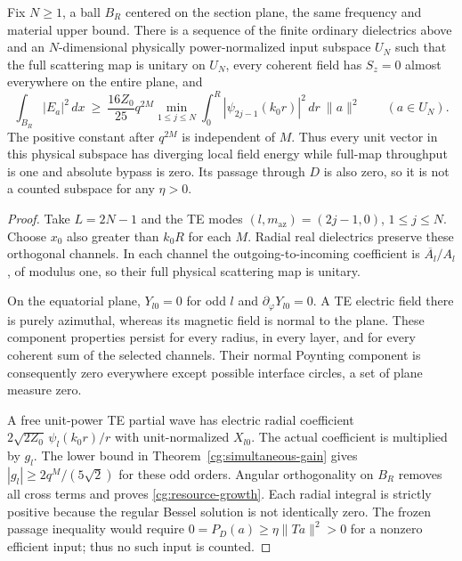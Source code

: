 \begin{theorem}
\label{cg:resource-counteraudit}
Fix $N\geq1$, a ball $B_R$ centered on the section plane, the same
frequency and material upper bound.  There is a sequence of the finite
ordinary dielectrics above and an $N$-dimensional physically
power-normalized input subspace $U_N$ such that the full scattering
map is unitary on $U_N$, every coherent field has
$S_z=0$ almost everywhere on the entire plane, and
\begin{equation}\label{cg:resource-growth}
 \int_{B_R}|E_a|^2\,dx
 \ \geq\ \frac{16Z_0}{25}q^{2M}
       \min_{1\leq j\leq N}
          \int_0^R|\psi_{2j-1}(k_0r)|^2\,dr\ \|a\|^2
 \qquad(a\in U_N).
\end{equation}
The positive constant after $q^{2M}$ is independent of $M$.
Thus every unit vector in this physical subspace has diverging local
field energy while full-map throughput is one and absolute bypass is
zero.  Its passage through $D$ is also zero, so it is not a counted
subspace for any $\eta>0$.
\end{theorem}
\begin{proof}
Take $L=2N-1$ and the TE modes $(l,m_{\mathrm{az}})=(2j-1,0)$,
$1\leq j\leq N$.  Choose $x_0$ also greater than $k_0R$ for each
$M$.  Radial real dielectrics preserve these orthogonal channels.
In each channel the outgoing-to-incoming coefficient is
$\overline{A_l}/A_l$, of modulus one, so their full physical
scattering map is unitary.

On the equatorial plane, $Y_{l0}=0$ for odd $l$ and
$\partial_\varphi Y_{l0}=0$.  A TE electric field there is purely
azimuthal, whereas its magnetic field is normal to the plane.
These component properties persist for every radius, in every layer,
and for every coherent sum of the selected channels.  Their normal
Poynting component is consequently zero everywhere except possible
interface circles, a set of plane measure zero.

A free unit-power TE partial wave has electric radial coefficient
$2\sqrt{2Z_0}\,\psi_l(k_0r)/r$ with unit-normalized $X_{l0}$.
The actual coefficient is multiplied by $g_l$.  The lower bound in
Theorem~\ref{cg:simultaneous-gain} gives
$|g_l|\geq2q^M/(5\sqrt2)$ for these odd orders.  Angular
orthogonality on $B_R$ removes all cross terms and proves
\eqref{cg:resource-growth}.  Each radial integral is strictly positive
because the regular Bessel solution is not identically zero.
The frozen passage inequality would require
$0=P_D(a)\geq\eta\|Ta\|^2>0$ for a nonzero efficient input;
thus no such input is counted.
\end{proof}

